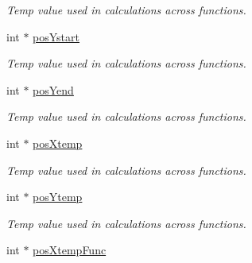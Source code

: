 \begin{DoxyCompactItemize}
\begin{DoxyCompactList}\small\item\em Temp value used in calculations across functions. \end{DoxyCompactList}\item 
\hypertarget{classgamescene__1__ladderSnake_afbfb7c101342e8875a5f92aae5d0145d}{int $\ast$ \hyperlink{classgamescene__1__ladderSnake_afbfb7c101342e8875a5f92aae5d0145d}{pos\-Ystart}}\label{classgamescene__1__ladderSnake_afbfb7c101342e8875a5f92aae5d0145d}

\begin{DoxyCompactList}\small\item\em Temp value used in calculations across functions. \end{DoxyCompactList}\item 
\hypertarget{classgamescene__1__ladderSnake_a0305757722dba83cbbc72b7d616b8453}{int $\ast$ \hyperlink{classgamescene__1__ladderSnake_a0305757722dba83cbbc72b7d616b8453}{pos\-Yend}}\label{classgamescene__1__ladderSnake_a0305757722dba83cbbc72b7d616b8453}

\begin{DoxyCompactList}\small\item\em Temp value used in calculations across functions. \end{DoxyCompactList}\item 
\hypertarget{classgamescene__1__ladderSnake_a5ca42a82f5abaece614f71eb6cf51551}{int $\ast$ \hyperlink{classgamescene__1__ladderSnake_a5ca42a82f5abaece614f71eb6cf51551}{pos\-Xtemp}}\label{classgamescene__1__ladderSnake_a5ca42a82f5abaece614f71eb6cf51551}

\begin{DoxyCompactList}\small\item\em Temp value used in calculations across functions. \end{DoxyCompactList}\item 
\hypertarget{classgamescene__1__ladderSnake_a6dfe0e78a12b63efc2178fcbedfbe2d4}{int $\ast$ \hyperlink{classgamescene__1__ladderSnake_a6dfe0e78a12b63efc2178fcbedfbe2d4}{pos\-Ytemp}}\label{classgamescene__1__ladderSnake_a6dfe0e78a12b63efc2178fcbedfbe2d4}

\begin{DoxyCompactList}\small\item\em Temp value used in calculations across functions. \end{DoxyCompactList}\item 
\hypertarget{classgamescene__1__ladderSnake_a712b23de16d8d538a054184467007904}{int $\ast$ \hyperlink{classgamescene__1__ladderSnake_a712b23de16d8d538a054184467007904}{pos\-Xtemp\-Func}}\label{classgamescene__1__ladderSnake_a712b23de16d8d538a054184467007904}


\end{DoxyCompactItemize}
